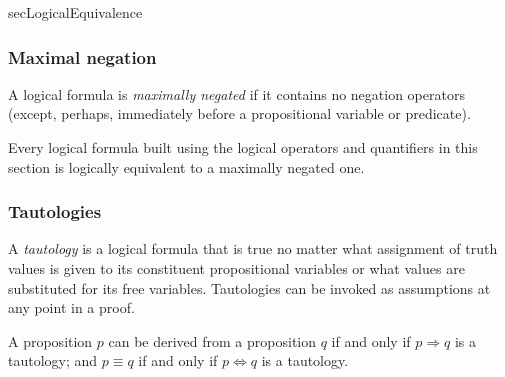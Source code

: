 \begin{tldr}{secLogicalEquivalence}
\subsubsection*{Maximal negation}

\begin{tldrlist}
A logical formula is \textit{maximally negated} if it contains no negation operators (except, perhaps, immediately before a propositional variable or predicate).

Every logical formula built using the logical operators and quantifiers in this section is logically equivalent to a maximally negated one.
\end{tldrlist}

\subsubsection*{Tautologies}

\begin{tldrlist}
A \textit{tautology} is a logical formula that is true no matter what assignment of truth values is given to its constituent propositional variables or what values are substituted for its free variables. Tautologies can be invoked as assumptions at any point in a proof.

A proposition $p$ can be derived from a proposition $q$ if and only if $p \Rightarrow q$ is a tautology; and $p \equiv q$ if and only if $p \Leftrightarrow q$ is a tautology.
\end{tldrlist}
\end{tldr}